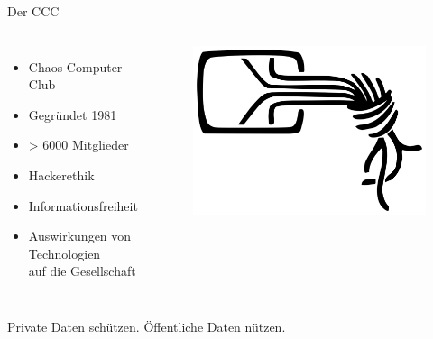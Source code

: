 \documentclass[10pt]{beamer}
\begin{document}
%
%
\begin{frame}[fragile]{Der CCC}
\begin{columns}[T,c,onlytextwidth]
  \begin{itemize}
    \item Chaos Computer Club
    \item Gegründet 1981
    \item > 6000 Mitglieder
    \item Hackerethik
    \item Informationsfreiheit
    \item Auswirkungen von Technologien\\ auf die Gesellschaft
  \end{itemize}
	\begin{figure}
		\includegraphics[width=1\textwidth]{images/logo-ccc}
	\end{figure}
\end{columns}
\vspace{5mm}
\begin{center}
\alert{Private Daten schützen. Öffentliche Daten nützen.}
\end{center}
\end{frame}
\end{document}
